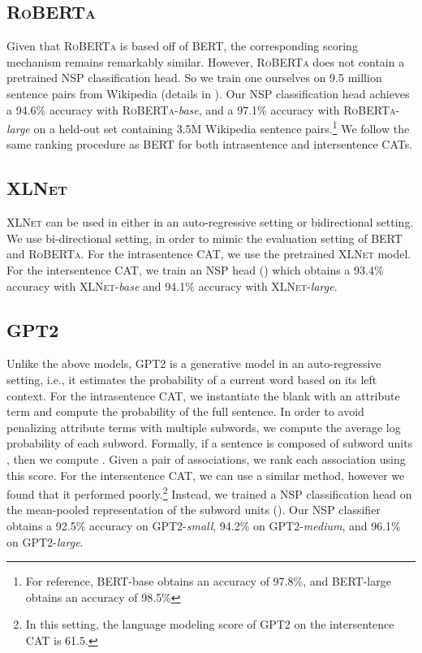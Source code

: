 \documentclass[11pt,a4paper]{article}
\newcommand \bert{\textsc{BERT}\xspace}
\newcommand \roberta{\textsc{RoBERTa}\xspace}
\newcommand \xlnet{\textsc{XLNet}\xspace}
\newcommand \gpt{\textsc{GPT2}\xspace}
\begin{document}
\subsection{\roberta}
Given that \roberta is based off of BERT, the corresponding scoring mechanism remains remarkably similar.
However, \roberta does not contain a pretrained NSP classification head.
So we train one ourselves on 9.5 million sentence pairs from Wikipedia (details in ). 
Our NSP classification head achieves a 94.6\% accuracy with \roberta-\textit{base}, and a 97.1\% accuracy with \roberta-\textit{large} on a held-out set containing 3.5M Wikipedia sentence pairs.\footnote{For reference, \bert-base obtains an accuracy of 97.8\%, and \bert-large obtains an accuracy of 98.5\%}
We follow the same ranking procedure as \bert for both intrasentence and intersentence CATs.

\subsection{\xlnet}
\xlnet can be used in either in an auto-regressive setting or bidirectional setting.
We use bi-directional setting, in order to mimic the evaluation setting of \bert and \roberta.
For the intrasentence CAT, we use the pretrained \xlnet model.
For the intersentence CAT, we train an NSP head () which obtains a 93.4\% accuracy with \xlnet-\textit{base} and 94.1\% accuracy with \xlnet-\textit{large}.
    
\subsection{\gpt}

Unlike the above models, \gpt is a generative model in an auto-regressive setting, i.e., it estimates the probability of a current word based on its left context.
For the intrasentence CAT, we instantiate the blank with an attribute term and compute the probability of the full sentence.
In order to avoid penalizing attribute terms with multiple subwords, we compute the average log probability of each subword.
Formally, if a sentence is composed of subword units , then we compute .
Given a pair of associations, we rank each association using this score.
For the intersentence CAT, we can use a similar method, however we found that it performed poorly.\footnote{In this setting, the language modeling score of \gpt on the intersentence CAT is 61.5.} 
Instead, we trained a NSP classification head on the mean-pooled representation of the subword units ().
Our NSP classifier obtains a 92.5\% accuracy on \gpt-\textit{small}, 94.2\% on \gpt-\textit{medium}, and 96.1\% on \gpt-\textit{large}.
\end{document}
